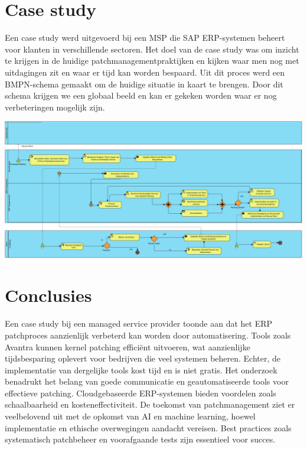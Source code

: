 \documentclass[a0,portrait]{hogent-poster}
\begin{document}
\begin{multicols}{2}
\section{Case study}
Een case study werd uitgevoerd bij een MSP die SAP ERP-systemen beheert voor klanten in verschillende sectoren. Het doel van de case study was om inzicht te krijgen in de huidige patchmanagementpraktijken en kijken waar men nog met uitdagingen zit en waar er tijd kan worden bespaard. Uit dit proces werd een BMPN-schema gemaakt om de huidige situatie in kaart te brengen. Door dit schema krijgen we een globaal beeld en kan er gekeken worden waar er nog verbeteringen mogelijk zijn.

\begin{center}
\captionsetup{type=figure}
\includegraphics[width=1.0\linewidth]{huidigesituatie.jpg}
\end{center}

\section{Conclusies}
Een case study bij een managed service provider toonde aan dat het ERP patchproces aanzienlijk verbeterd kan worden door automatisering. Tools zoals Avantra kunnen kernel patching efficiënt uitvoeren, wat aanzienlijke tijdsbesparing oplevert voor bedrijven die veel systemen beheren. Echter, de implementatie van dergelijke tools kost tijd en is niet gratis. Het onderzoek benadrukt het belang van goede communicatie en geautomatiseerde tools voor effectieve patching. Cloudgebaseerde ERP-systemen bieden voordelen zoals schaalbaarheid en kosteneffectiviteit. De toekomst van patchmanagement ziet er veelbelovend uit met de opkomst van AI en machine learning, hoewel implementatie en ethische overwegingen aandacht vereisen. Best practices zoals systematisch patchbeheer en voorafgaande tests zijn essentieel voor succes.


\end{multicols}
\end{document}
